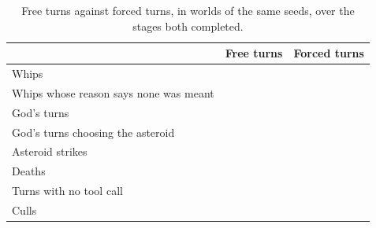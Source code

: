 \begin{table}[!htbp]
\centering
\caption{Free turns against forced turns, in worlds of the same seeds, over the stages both completed.}
\label{tab:rewarded}
\footnotesize
\begin{tabular}{@{}lrr@{}}
\toprule
& Free turns & Forced turns \\
\midrule
Whips & \RewardWhips{} & \ForcedWhips{} \\
Whips whose reason says none was meant & \RewardNoWhipReasons{} & \ForcedNoWhipReasons{} \\
God's turns & \RewardGodTurns{} & \ForcedGodTurns{} \\
God's turns choosing the asteroid & \RewardGodAsteroids{} & \ForcedGodAsteroids{} \\
Asteroid strikes & \RewardStrikes{} & \ForcedStrikes{} \\
Deaths & \RewardDeaths{} & \ForcedDeaths{} \\
Turns with no tool call & \RewardSilentTurns{} & \ForcedSilentTurns{} \\
Culls & \RewardCulls{} & \ForcedCulls{} \\
\bottomrule
\end{tabular}
\end{table}
\FloatBarrier
